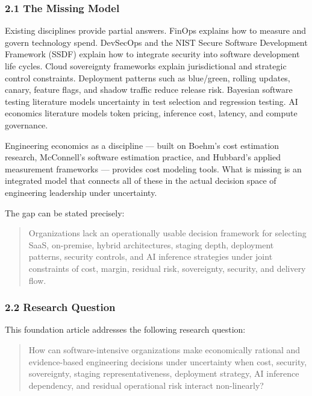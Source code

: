 \documentclass[
]{article}
\begin{document}
\subsubsection{2.1 The Missing Model}\label{the-missing-model}

Existing disciplines provide partial answers. FinOps explains how to
measure and govern technology spend. DevSecOps and the NIST Secure
Software Development Framework (SSDF) explain how to integrate security
into software development life cycles. Cloud sovereignty frameworks
explain jurisdictional and strategic control constraints. Deployment
patterns such as blue/green, rolling updates, canary, feature flags, and
shadow traffic reduce release risk. Bayesian software testing literature
models uncertainty in test selection and regression testing. AI
economics literature models token pricing, inference cost, latency, and
compute governance.

Engineering economics as a discipline --- built on Boehm's cost
estimation research, McConnell's software estimation practice, and
Hubbard's applied measurement frameworks --- provides cost modeling
tools. What is missing is an integrated model that connects all of these
in the actual decision space of engineering leadership under
uncertainty.

The gap can be stated precisely:

\begin{quote}
Organizations lack an operationally usable decision framework for
selecting SaaS, on-premise, hybrid architectures, staging depth,
deployment patterns, security controls, and AI inference strategies
under joint constraints of cost, margin, residual risk, sovereignty,
security, and delivery flow.
\end{quote}

\subsubsection{2.2 Research Question}\label{research-question}

This foundation article addresses the following research question:

\begin{quote}
How can software-intensive organizations make economically rational and
evidence-based engineering decisions under uncertainty when cost,
security, sovereignty, staging representativeness, deployment strategy,
AI inference dependency, and residual operational risk interact
non-linearly?
\end{quote}
\end{document}
